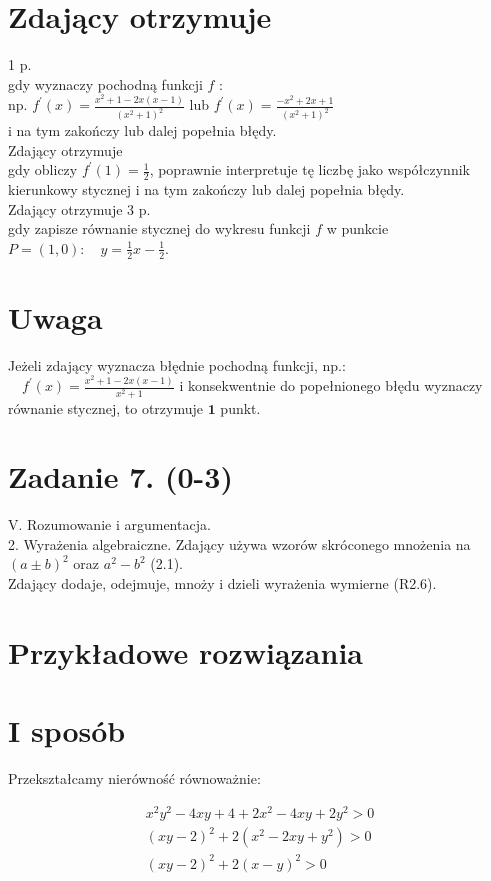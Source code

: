 \documentclass[10pt]{article}
\begin{document}
\section*{Zdający otrzymuje}
1 p.\\
gdy wyznaczy pochodną funkcji $f$ :\\
np. $f^{\prime}(x)=\frac{x^{2}+1-2 x(x-1)}{\left(x^{2}+1\right)^{2}}$ lub $f^{\prime}(x)=\frac{-x^{2}+2 x+1}{\left(x^{2}+1\right)^{2}}$\\
i na tym zakończy lub dalej popełnia błędy.\\
Zdający otrzymuje\\
gdy obliczy $f^{\prime}(1)=\frac{1}{2}$, poprawnie interpretuje tę liczbę jako współczynnik kierunkowy stycznej i na tym zakończy lub dalej popełnia błędy.\\
Zdający otrzymuje 3 p.\\
gdy zapisze równanie stycznej do wykresu funkcji $f$ w punkcie $P=(1,0): \quad y=\frac{1}{2} x-\frac{1}{2}$.

\section*{Uwaga}
Jeżeli zdający wyznacza błędnie pochodną funkcji, np.: $\quad f^{\prime}(x)=\frac{x^{2}+1-2 x(x-1)}{x^{2}+1}$ i konsekwentnie do popełnionego błędu wyznaczy równanie stycznej, to otrzymuje $\mathbf{1}$ punkt.

\section*{Zadanie 7. (0-3)}
V. Rozumowanie i argumentacja.\\
2. Wyrażenia algebraiczne. Zdający używa wzorów skróconego mnożenia na $(a \pm b)^{2}$ oraz $a^{2}-b^{2}$ (2.1).\\
Zdający dodaje, odejmuje, mnoży i dzieli wyrażenia wymierne (R2.6).

\section*{Przykładowe rozwiązania}
\section*{I sposób}
Przekształcamy nierówność równoważnie:

$$
\begin{gathered}
x^{2} y^{2}-4 x y+4+2 x^{2}-4 x y+2 y^{2}>0 \\
(x y-2)^{2}+2\left(x^{2}-2 x y+y^{2}\right)>0 \\
(x y-2)^{2}+2(x-y)^{2}>0
\end{gathered}
$$
\end{document}

